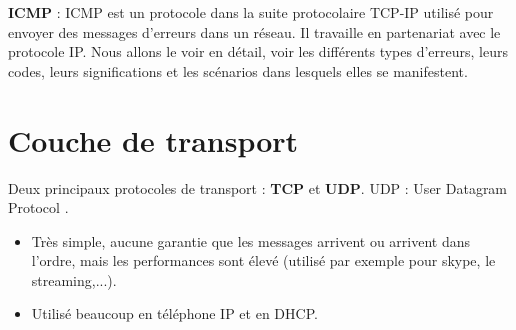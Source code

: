 \documentclass[a4paper,9pt, twocolumn]{article}
\begin{document}
	\textbf{ICMP} : ICMP est un protocole dans la suite protocolaire TCP-IP utilisé pour envoyer des messages d'erreurs dans un réseau.
	Il travaille en partenariat avec le protocole IP.
	Nous allons le voir en détail, voir les différents types d'erreurs, leurs codes, leurs significations et les scénarios dans lesquels elles se manifestent.


\section*{Couche de transport}

	Deux principaux protocoles de transport : \textbf{TCP} et \textbf{UDP}.
	UDP : User Datagram Protocol .
	\begin{itemize}
		\item Très simple, aucune garantie que les messages arrivent ou arrivent dans l'ordre, mais les performances sont élevé (utilisé par exemple pour skype, le streaming,...).
		\item Utilisé beaucoup en téléphone IP et en DHCP.
	\end{itemize}
	
\end{document}
